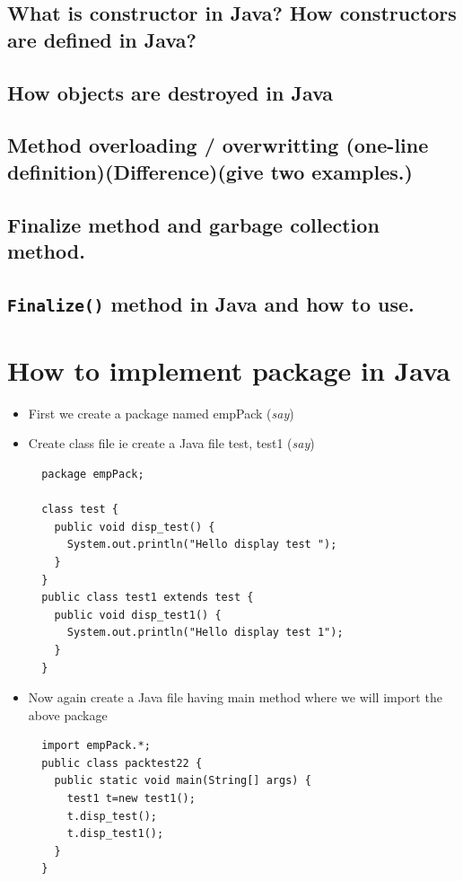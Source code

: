 \documentclass[11pt, a4paper]{book}
\begin{document}
  \subsection{What is constructor in Java? How constructors are defined in Java?}
  \subsection{How objects are destroyed in Java}
 
  \subsection{Method overloading / overwritting (one-line definition)(Difference)(give two examples.)}
  \subsection{Finalize method and garbage collection method.}
  \subsection{\texttt{Finalize()} method in Java and how to use.}%
 
\newpage
\section{How to implement package in Java}
\begin{itemize}
  \item First we create a package named empPack (\textit{say})
  \item Create class file ie create a Java file test, test1 (\textit{say})
\begin{lstlisting}
  package empPack;

  class test {
    public void disp_test() {
      System.out.println("Hello display test ");
    }
  }
  public class test1 extends test {
    public void disp_test1() {
      System.out.println("Hello display test 1");
    }
  }
\end{lstlisting}
  \item Now again create a Java file having main method where we will import the above package
\begin{lstlisting}
  import empPack.*;
  public class packtest22 {
    public static void main(String[] args) {
      test1 t=new test1();
      t.disp_test();
      t.disp_test1();
    }
  }
\end{lstlisting}
\end{itemize}
\end{document}
